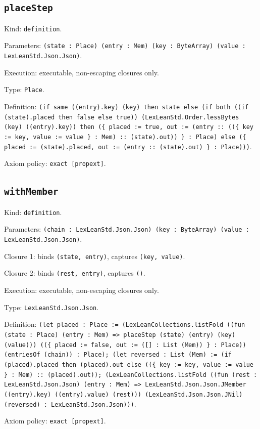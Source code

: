 \documentclass[11pt]{article}
\begin{document}
\subsection*{\texttt{placeStep}}
\noindent Kind: \texttt{definition}.\par
\noindent Parameters: \texttt{(state : Place) (entry : Mem) (key : ByteArray) (value : LexLeanStd.Json.Json)}.\par
\noindent Execution: executable, non-escaping closures only.\par
\noindent Type: \texttt{Place}.\par
\noindent Definition: \texttt{(if same ((entry).key) (key) then state else (if both ((if (state).placed then false else true)) (LexLeanStd.Order.lessBytes (key) ((entry).key)) then (\{ placed := true, out := (entry :: ((\{ key := key, value := value \} : Mem) :: (state).out)) \} : Place) else (\{ placed := (state).placed, out := (entry :: (state).out) \} : Place)))}.\par
\noindent Axiom policy: \texttt{exact [propext]}.\par
\subsection*{\texttt{withMember}}
\noindent Kind: \texttt{definition}.\par
\noindent Parameters: \texttt{(chain : LexLeanStd.Json.Json) (key : ByteArray) (value : LexLeanStd.Json.Json)}.\par
\noindent Closure 1: binds \texttt{(state, entry)}, captures \texttt{(key, value)}.\par
\noindent Closure 2: binds \texttt{(rest, entry)}, captures \texttt{()}.\par
\noindent Execution: executable, non-escaping closures only.\par
\noindent Type: \texttt{LexLeanStd.Json.Json}.\par
\noindent Definition: \texttt{(let placed : Place := (LexLeanCollections.listFold ((fun (state : Place) (entry : Mem) => placeStep (state) (entry) (key) (value))) ((\{ placed := false, out := ([] : List (Mem)) \} : Place)) (entriesOf (chain)) : Place); (let reversed : List (Mem) := (if (placed).placed then (placed).out else ((\{ key := key, value := value \} : Mem) :: (placed).out)); (LexLeanCollections.listFold ((fun (rest : LexLeanStd.Json.Json) (entry : Mem) => LexLeanStd.Json.Json.JMember ((entry).key) ((entry).value) (rest))) (LexLeanStd.Json.Json.JNil) (reversed) : LexLeanStd.Json.Json)))}.\par
\noindent Axiom policy: \texttt{exact [propext]}.\par
\end{document}
